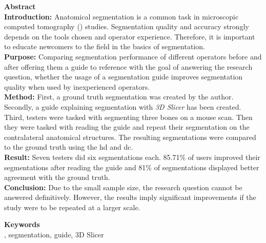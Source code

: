 
\newcommand*{\AbstractHead}[1]{%
	{\noindent\sffamily\Large\textbf{#1}}
	\vspace{10pt}\\
}%

\newcommand*{\SomeSpace}{%
	\vspace{\baselineskip}
}

\AbstractHead{Abstract}
\noindent
\normalsize
\textbf{Introduction:} Anatomical segmentation is a common task in microscopic computed tomography (\mct) studies. Segmentation quality and accuracy strongly depends on the tools chosen and operator experience. Therefore, it is important to educate newcomers to the field in the basics of \mct\space segmentation.\\
\textbf{Purpose:} Comparing segmentation performance of different operators before and after offering them a guide to reference with the goal of answering the research question, whether the usage of a segmentation guide improves segmentation quality when used by inexperienced operators.\\
\textbf{Method:} First, a ground truth segmentation was created by the author. Secondly, a guide explaining \mct\space segmentation with \textit{3D Slicer} has been created. Third, testers were tasked with segmenting three bones on a mouse \mct\space scan. Then they were tasked with reading the guide and repeat their segmentation on the contralateral anatomical structures. The resulting segmentations were compared to the ground truth using the \acrfull{hd} and \acrfull{dc}.\\
\textbf{Result:} Seven testers did six segmentations each. 85.71\% of users improved their segmentations after reading the guide and 81\% of segmentations displayed better agreement with the ground truth.\\
\textbf{Conclusion:} Due to the small sample size, the research question cannot be answered definitively. However, the results imply significant improvements if the study were to be repeated at a larger scale.\\
\SomeSpace
\AbstractHead{Keywords}
\normalsize
\noindent
\mct, segmentation, guide, 3D Slicer

\glsresetall{}
\SomeSpace
